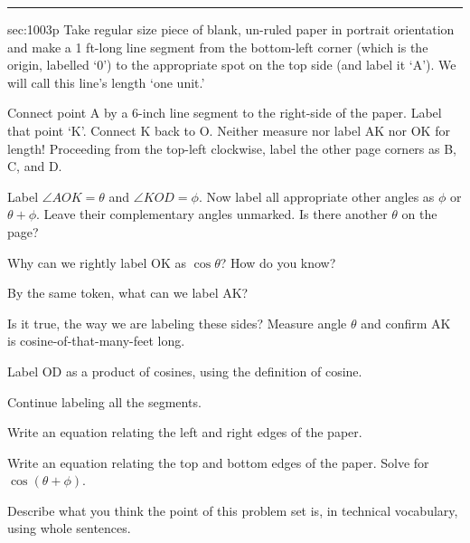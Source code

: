\renewcommand{\columnseprule}{1.5pt}
\begin{multicols*}{2}
\rule[0.5\baselineskip]{0.4\textwidth}{1pt}
\noindent
{}\label{sec:1003p}
\begin{exercises}{sec:1003p}
\lab{} Take regular size piece of blank, un-ruled paper in portrait orientation and make a 1 ft-long line segment from the bottom-left corner (which is the origin, labelled `0') to the appropriate spot on the top side (and label it `A').  We will call this line's length `one unit.'

\vspace{1cm}
\lab{} Connect point A by a 6-inch line segment to the right-side of the paper.  Label that point `K'.  Connect K back to O.  Neither measure nor label AK nor OK for length!  Proceeding from the top-left clockwise, label the other page corners as B, C, and D.

\vspace{1cm}
\lab{} Label $\angle AOK=\theta$ and $\angle KOD=\phi$.  Now label all appropriate other angles as $\phi$ or $\theta + \phi$.  Leave their complementary angles unmarked.  Is there another $\theta$ on the page?

\vspace{2cm}
\lab{}  Why can we rightly label OK as $\cos{\theta}$?  How do you know?

\vspace{2cm}
\lab{} By the same token, what can we label AK?

\vspace{3cm}
\lab{} Is it true, the way we are labeling these sides?  Measure angle $\theta$ and confirm AK is cosine-of-that-many-feet long.

\vspace{3cm}
\lab{}  Label OD as a product of cosines, using the definition of cosine.

\vspace{2cm}
\lab{} Continue labeling all the segments.

\vspace{1cm}
\lab{}  Write an equation relating the left and right edges of the paper.

\vspace{3cm}
\lab{}  Write an equation relating the top and bottom edges of the paper.  Solve for $\cos{(\theta+ \phi)}$.

\vspace{4cm}
\lab{} Describe what you think the point of this problem set is, in technical vocabulary, using whole sentences.
\end{exercises}
\end{multicols*}